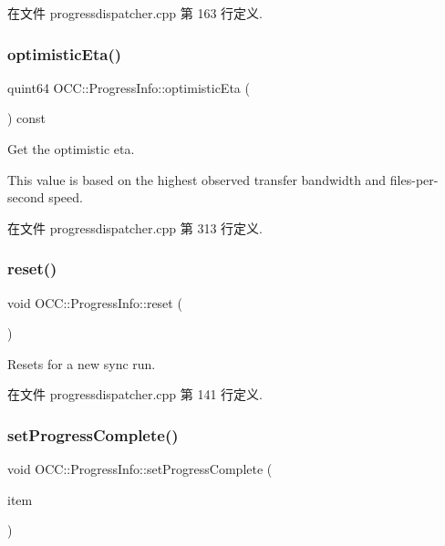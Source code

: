 在文件 progressdispatcher.\+cpp 第 163 行定义.

\mbox{\label{class_o_c_c_1_1_progress_info_aeb96d14b9b572cce5bea986382cce5e7}} 
\subsubsection{\texorpdfstring{optimistic\+Eta()}{optimisticEta()}}
{\footnotesize\ttfamily quint64 O\+C\+C\+::\+Progress\+Info\+::optimistic\+Eta (\begin{DoxyParamCaption}{ }\end{DoxyParamCaption}) const}

Get the optimistic eta.

This value is based on the highest observed transfer bandwidth and files-\/per-\/second speed. 

在文件 progressdispatcher.\+cpp 第 313 行定义.

\mbox{\label{class_o_c_c_1_1_progress_info_aeced3c151e007e246f8fd5b75d7e7e82}} 
\subsubsection{\texorpdfstring{reset()}{reset()}}
{\footnotesize\ttfamily void O\+C\+C\+::\+Progress\+Info\+::reset (\begin{DoxyParamCaption}{ }\end{DoxyParamCaption})}

Resets for a new sync run. 

在文件 progressdispatcher.\+cpp 第 141 行定义.

\mbox{\label{class_o_c_c_1_1_progress_info_a624d0dc2cd7c0d3a0b462ec895ea062c}} 
\subsubsection{\texorpdfstring{set\+Progress\+Complete()}{setProgressComplete()}}
{\footnotesize\ttfamily void O\+C\+C\+::\+Progress\+Info\+::set\+Progress\+Complete (\begin{DoxyParamCaption}\item[{const \hyperlink{class_o_c_c_1_1_sync_file_item}{Sync\+File\+Item} \&}]{item }\end{DoxyParamCaption})}



